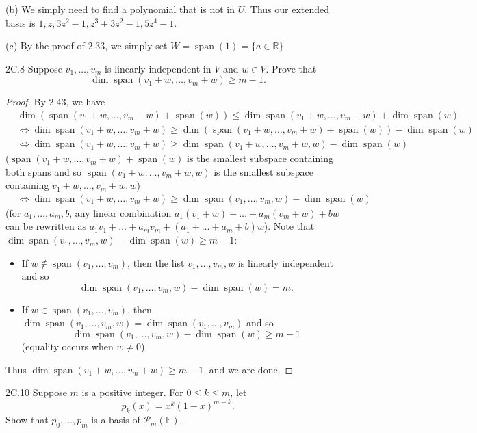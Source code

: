 \documentclass{exam}
\DeclareMathOperator{\spn}{span}
\begin{document}
(b) We simply need to find a polynomial that is not in $U$. Thus our extended basis is $1, z, 3z^2 - 1, z^3 + 3z^2 - 1, 5z^4 - 1$.

(c) By the proof of 2.33, we simply set $W = \spn(1) = \{a\in\mathbb R\}$.

\begin{problem}{2C.8}
    Suppose $v_1, \dots, v_m$ is linearly independent in $V$ and $w\in V$. Prove that \[
        \dim\spn(v_1 + w, \dots, v_m + w) \ge m-1.
    \]
\end{problem}

\begin{proof}
    By 2.43, we have
    \begin{align*}
        &\dim(\spn(v_1 + w, \dots, v_m + w) + \spn(w)) \le \dim\spn(v_1 + w, \dots, v_m + w) + \dim\spn(w)\\
        &\iff\dim\spn(v_1 + w, \dots, v_m + w) \ge \dim(\spn(v_1 + w, \dots, v_m + w) + \spn(w)) - \dim\spn(w)\\
        &\iff\dim\spn(v_1 + w, \dots, v_m + w) \ge \dim\spn(v_1 + w, \dots, v_m + w, w) - \dim\spn(w)
    \end{align*}
    ($\spn(v_1 + w, \dots, v_m + w) + \spn(w)$ is the smallest subspace containing both spans and so $\spn(v_1 + w, \dots, v_m + w, w)$ is the smallest subspace containing $v_1 + w, \dots, v_m + w, w$)
    \begin{align*}
        &\iff\dim\spn(v_1 + w, \dots, v_m + w) \ge \dim\spn(v_1, \dots, v_m , w) - \dim\spn(w)
    \end{align*}
    (for $a_1, \dots, a_m, b$, any linear combination $a_1(v_1 + w) + \dots + a_m(v_m + w) + bw$ can be rewritten as $a_1v_1 + \dots + a_mv_m + (a_1 + \dots + a_m + b)w$). Note that $\dim\spn(v_1, \dots, v_m, w) - \dim\spn(w) \ge m - 1$: 
    \begin{itemize}
        \item If $w\notin\spn(v_1, \dots, v_m)$, then the list $v_1, \dots, v_m, w$ is linearly independent and so $$\dim\spn(v_1, \dots, v_m, w) - \dim\spn(w) = m.$$
        \item If $w\in\spn(v_1, \dots, v_m)$, then $\dim\spn(v_1, \dots, v_m, w) = \dim\spn(v_1, \dots, v_m)$ and so $$\dim\spn(v_1, \dots, v_m, w) - \dim\spn(w) \ge m - 1$$ (equality occurs when $w\neq 0$).
    \end{itemize}
    Thus $\dim\spn(v_1 + w, \dots, v_m + w) \ge m - 1$, and we are done.
\end{proof}

\begin{problem}{2C.10}
    Suppose $m$ is a positive integer. For $0\le k\le m$, let \[
        p_k(x) = x^k(1 - x)^{m - k}.
    \]
    Show that $p_0, \dots, p_m$ is a basis of $\mathcal P_m(\mathbb F)$.
\end{problem}
\end{document}
